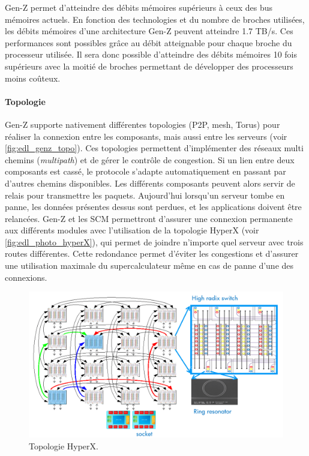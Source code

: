         Gen-Z permet d'atteindre des débits mémoires supérieurs à ceux des bus mémoires actuels. En fonction des technologies et du nombre de broches utilisées, les débits mémoires d'une architecture Gen-Z peuvent atteindre 1.7 TB/s. Ces performances sont possibles grâce au débit atteignable pour chaque broche du processeur utilisée. Il sera donc possible d'atteindre des débits mémoires 10 fois supérieurs avec la moitié de broches permettant de développer des processeurs moins coûteux. 
        
            
            
            

    \paragraph{Topologie}

        Gen-Z supporte nativement différentes topologies (P2P, mesh, Torus) pour réaliser la connexion entre les composants, mais aussi entre les serveurs (voir \autoref{fig:edl_genz_topo}). Ces topologies permettent d'implémenter des réseaux multi chemins (\textit{multipath}) et de gérer le contrôle de congestion. Si un lien entre deux composants est cassé, le protocole s'adapte automatiquement en passant par d'autres chemins disponibles. Les différents composants peuvent alors servir de relais pour transmettre les paquets. Aujourd'hui lorsqu'un serveur tombe en panne, les données présentes dessus sont perdues, et les applications doivent être relancées. Gen-Z et les SCM permettront d'assurer une connexion permanente aux différents modules avec l'utilisation de la topologie HyperX \cite{Ahn2009} (voir \autoref{fig:edl_photo_hyperX}),  qui permet de joindre n'importe quel serveur avec trois routes différentes. Cette redondance permet d'éviter les congestions et d'assurer une utilisation maximale du supercalculateur même en cas de panne d'une des connexions.
             
        \begin{figure}
            \center
            \includegraphics[width=14cm]{images/edl_photo_hyperX.png}
            \caption{\label{fig:edl_photo_hyperX} Topologie HyperX.}
        \end{figure} 
            
